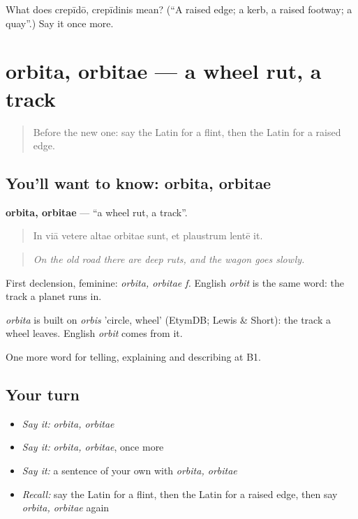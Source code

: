 \begin{tcolorbox}[breakable,colback=teal!4,colframe=teal!35!black,title={Before you move on}]
What does crepīdō, crepīdinis mean? (\textquotedblleft{}A raised edge; a kerb, a raised footway; a quay\textquotedblright{}.) Say it once more.
\end{tcolorbox}
\section[orbita, orbitae]{orbita, orbitae — a wheel rut, a track}

\label{lesson:LA-C425-orbita}



\begin{quote}
Before the new one: say the Latin for a flint, then the Latin for a raised edge.
\end{quote}

\subsection*{You'll want to know: orbita, orbitae}
\textbf{orbita, orbitae} — \textquotedblleft{}a wheel rut, a track\textquotedblright{}.

\begin{quote}
In viā vetere altae orbitae sunt, et plaustrum lentē it.
\end{quote}

\begin{quote}
\emph{On the old road there are deep ruts, and the wagon goes slowly.}
\end{quote}

First declension, feminine: \emph{orbita, orbitae f.} English \emph{orbit} is the same word: the track a planet runs in.

\begin{cousinweb}
\emph{orbita} is built on \emph{orbis} 'circle, wheel' (EtymDB; Lewis \& Short): the track a wheel leaves. English \emph{orbit} comes from it.
\end{cousinweb}

\begin{grammarlens}[title={What you've built}]
One more word for telling, explaining and describing at B1.
\end{grammarlens}

\subsection*{Your turn}
\begin{itemize}
\raggedright
  \item \emph{Say it:} \emph{orbita, orbitae}
  \item \emph{Say it:} \emph{orbita, orbitae}, once more
  \item \emph{Say it:} a sentence of your own with \emph{orbita, orbitae}
  \item \emph{Recall:} say the Latin for a flint, then the Latin for a raised edge, then say \emph{orbita, orbitae} again
\end{itemize}

